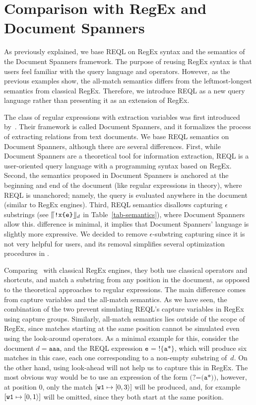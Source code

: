 \section{Comparison with RegEx and Document Spanners} 
As previously explained, we base REQL on RegEx syntax and the semantics of the
Document Spanners framework. The purpose of reusing RegEx syntax is that users
feel familiar with the query language and operators. However, as the previous
examples show, the all-match semantics differs from the leftmost-longest
semantics from classical RegEx. Therefore, we introduce REQL as a new query
language rather than presenting it as an extension of RegEx. 

The class of regular expressions with extraction variables was first introduced
by~\citet{FaginKRV15}. Their framework is called Document Spanners, and it
formalizes the process of extracting relations from text documents. We base REQL
semantics on Document Spanners, although there are several differences. First,
while Document Spanners are a theoretical tool for information extraction, REQL
is a user-oriented query language with a programming syntax based on RegEx.
Second, the semantics proposed in Document Spanners is anchored at the beginning
and end of the document (like regular expressions in theory), where REQL is
unanchored; namely, the query is evaluated anywhere in the document (similar to
RegEx engines). Third, REQL semantics disallows capturing $\epsilon$ substrings
(see $\llceil{\texttt{!x\{e\}}}\rrfloor_{d}$ in Table~\ref{tab-semantics}), where Document
Spanners allow this. %
difference is minimal, it implies that Document Spanners' language is slightly
more expressive. We decided to remove $\epsilon$-substring capturing since it is
not very helpful for users, and its removal simplifies several optimization
procedures in \rematch.

Comparing \rematch\ with classical RegEx engines, they both use classical
operators and shortcuts, and  match a substring from any position in the
document, as opposed to the theoretical approaches to regular expressions. The
main difference comes from capture variables and the all-match semantics. As we
have seen, the combination of the two prevent simulating REQL's capture
variables in RegEx using capture groups. Similarly, all-match semantics lies
outside of the scope of RegEx, since matches starting at the same position
cannot be simulated even using the look-around operators. As a minimal example
for this, consider the document $d = \texttt{aaa}$, and the REQL expression
$\texttt{e = !\{a*\}}$, which will produce six matches in this case, each one
corresponding to a non-empty substring of~$d$. On the other hand, using
look-ahead will not help us to capture this in RegEx. The most obvious way would
be to use an expression of the form $\texttt{(?=(a*))}$, however, at position 0,
only the match $[\texttt{w1} \mapsto [0, 3\rangle]$ will be produced, and, for
example $[\texttt{w1} \mapsto [0, 1\rangle]$ will be omitted, since they both
start at the same position.

